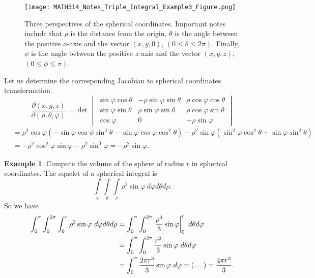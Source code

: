 \documentclass[
	12pt,
	]{article}
\newcommand{\vphi}{\varphi}
\theoremstyle{custom}
\theoremstyle{custom}
\theoremstyle{custom}
\theoremstyle{custom}
\theoremstyle{custom}
\theoremstyle{definition}
\newtheorem{example}{Example}[section]
\theoremstyle{example}
\theoremstyle{note}
\theoremstyle{remark}
\theoremstyle{example}
\newcounter{theo}[section]\setcounter{theo}{0}
\numberwithin{equation}{subsection}
\begin{document}
  		\begin{figure}[H]
  			\centering
  			\texttt{[image: MATH314\_Notes\_Triple\_Integral\_Example3\_Figure.png]}
  			\captionsetup{margin=1cm, justification=raggedright}\caption{Three perspectives of the spherical coordinates. Important notes include that $\rho$ is the distance from the origin, $\theta$ is the angle between the positive $x$-axis and the vector $(x,y,0)$, $(0\le \theta \le 2\pi)$. Finally, $\phi$ is the angle between the positive $z$-axis and the vector $(x,y,z)$, $(0 \le \phi \le \pi)$.}
  		\end{figure}
  		Let us determine the corresponding Jacobian to spherical coordinates transformation. 
  		\begin{equation*}
  			\frac{\partial (x,y,z)}{\partial (\rho, \theta, \vphi)}  = 
  			\det\begin{vmatrix}
  				\sin\vphi \cos \theta & -\rho \sin \vphi \sin \theta & \rho \cos \vphi \cos \theta \\
  				\sin\vphi \sin \theta & \rho \sin \vphi \sin \theta & \rho \cos \vphi \sin \theta \\
  				\cos \vphi & 0 & -\rho \sin \vphi
  			\end{vmatrix}
  		\end{equation*}
  		\begin{align*}
  			&= \rho^{2} \cos \vphi (-\sin\vphi \cos \phi \sin ^{2}\theta - \sin \vphi\cos \vphi \cos^{2}\theta )- \rho^{2}\sin \vphi(\sin^{2}\vphi \cos^{2} \theta + \sin \vphi \sin^{2 }\theta) \\
  			&= -\rho^{2}\cos^{2} \vphi \sin \vphi - \rho^{2}\sin^{3}\vphi = \boxed{-\rho^{2}\sin \vphi} .
  		\end{align*}
  		
  		\begin{example}
  			Compute the volume of the sphere of radius $r$ in spherical coordinates.
  			The squelet of a spherical integral is 
  			$$\int\limits_{\vphi} \int\limits_{\theta}\int\limits_{\rho} \rho^{2} \sin \vphi \ d\vphi d\theta d\rho.$$
  			So we have 
  			\begin{align*}
  				\int_{0}^{\pi} \int_{0}^{2\pi} \int_{0}^{r} \rho^{2}\sin \vphi \ d\vphi d\theta d \rho &= \int_{0}^{\pi} \int_{0}^{2\pi} \eval{\frac{\rho^{3}}{3} \sin \vphi}_{0}^{r} \ d\theta d \vphi \\
  				&=\int_{0}^{\pi}\int_{0}^{2\pi} \frac{r^{2}}{3}\sin \vphi \ d\theta d \vphi \\
  				&= \int_{0}^{\pi} \frac{2\pi r^{3}}{3} \sin \vphi \ d\vphi = (\dots ) = \frac{4\pi r^{3}}{3}.
  			\end{align*}
  		\end{example}
\end{document}
